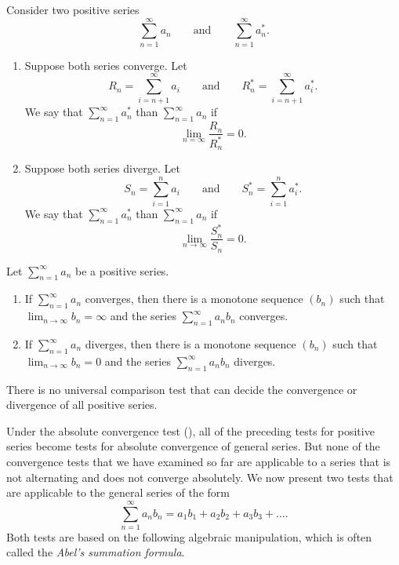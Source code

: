 \begin{definition}
  Consider two positive series
  \[ \sum_{n = 1}^{\infty} a_n \qquad \text{and} \qquad \sum_{n =
  1}^{\infty} a_n^\ast. \]
  \begin{enumerate}
    \item Suppose both series converge. Let
      \[ R_n = \sum_{i = n + 1}^{\infty} a_i \qquad \text{and} \qquad
      R_n^\ast = \sum_{i = n + 1}^{\infty} a_i^\ast. \]
      We say that $\sum_{n = 1}^{\infty} a_n^\ast$  than $\sum_{n = 1}^{\infty} a_n$ if
      \[ \lim_{n = \infty} \frac{R_n}{R_n^\ast} = 0. \]
    \item Suppose both series diverge. Let
      \[ S_n = \sum_{i = 1}^{n} a_i \qquad \text{and} \qquad S_n^\ast
      = \sum_{i = 1}^{n} a_i^\ast. \]
      We say that $\sum_{n = 1}^{\infty} a_n^\ast$  than $\sum_{n = 1}^{\infty} a_n$ if
      \[ \lim_{n \to \infty} \frac{S_n^\ast}{S_n} = 0. \]
  \end{enumerate}
\end{definition}

\begin{lemma}
  Let $\sum_{n = 1}^{\infty} a_n$ be a positive series.
  \begin{enumerate}
    \item If $\sum_{n = 1}^{\infty} a_n$ converges, then there is a
      monotone sequence $(b_n)$ such that \\
      $\lim_{n \to \infty} b_n = \infty$ and the series $\sum_{n =
      1}^{\infty} a_n b_n$ converges.
    \item If $\sum_{n = 1}^{\infty} a_n$ diverges, then there is a
      monotone sequence $(b_n)$ such that \\
      $\lim_{n \to \infty} b_n = 0$ and the series $\sum_{n =
      1}^{\infty} a_n b_n$ diverges.
  \end{enumerate}
\end{lemma}

\begin{theorem}
  There is no universal comparison test that can decide the
  convergence or divergence of all positive series.
\end{theorem}

\begin{remark}
  Under the absolute convergence test
  (), all of the preceding tests
  for positive series become tests for absolute convergence of
  general series. But none of the convergence tests that we have
  examined so far are applicable to a series that is not alternating
  and does not converge absolutely. We now present two tests that are
  applicable to the general series of the form
  \[ \sum_{n = 1}^{\infty} a_n b_n = a_1 b_1 + a_2 b_2 + a_3 b_3 + \dots. \]
  Both tests are based on the following algebraic manipulation, which
  is often called the \textit{Abel's summation formula}.
\end{remark}

